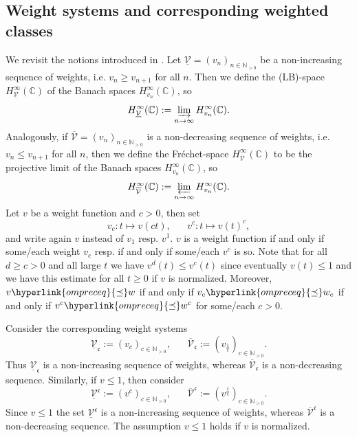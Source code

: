 \documentclass[10pt]{amsart}%
\numberwithin{equation}{section}
\theoremstyle{plain}
\newcommand{\CC}{\mathbb{C}}
\newcommand{\NN}{\mathbb{N}}
\begin{document}
\subsection{Weight systems and corresponding weighted classes}\label{basicweightsection}
We revisit the notions introduced in \cite[Sect. 2.2]{weightedentirecharacterization}. Let $\underline{\mathcal{V}}=(v_n)_{n\in\NN_{>0}}$ be a non-increasing sequence of weights, i.e. $v_n\ge v_{n+1}$ for all $n$. Then we define the (LB)-space $H^{\infty}_{\underline{\mathcal{V}}}(\CC)$ of the Banach spaces $H^{\infty}_{v_n}(\CC)$, so
\begin{equation}\label{indlim}
H^{\infty}_{\underline{\mathcal{V}}}(\CC):=\varinjlim_{n\rightarrow\infty}H^{\infty}_{v_n}(\CC).
\end{equation}
Analogously, if $\overline{\mathcal{V}}=(v_n)_{n\in\NN_{>0}}$ is a non-decreasing sequence of weights, i.e. $v_n\le v_{n+1}$ for all $n$, then we define the Fr\'{e}chet-space $H^{\infty}_{\overline{\mathcal{V}}}(\CC)$ to be the projective limit of the Banach spaces $H^{\infty}_{v_n}(\CC)$, so
\begin{equation}\label{projlim}
H^{\infty}_{\overline{\mathcal{V}}}(\CC):=\varprojlim_{n\rightarrow\infty}H^{\infty}_{v_n}(\CC).
\end{equation}
Let $v$ be a weight function and $c>0$, then set
\begin{equation}\label{parameterweights}
v_c: t\mapsto v(ct),\hspace{20pt}v^c: t\mapsto v(t)^c,
\end{equation}
and write again $v$ instead of $v_1$ resp. $v^1$. $v$ is a weight function if and only if some/each weight $v_c$ resp. if and only if some/each $v^c$ is so. Note that for all $d\ge c>0$ and all large $t$ we have $v^d(t)\le v^c(t)$ since eventually $v(t)\le 1$ and we have this estimate for all $t\ge 0$ if $v$ is normalized. Moreover, $v\hyperlink{ompreceq}{\preceq}w$ if and only if $v_c\hyperlink{ompreceq}{\preceq}w_c$ if and only if $v^c\hyperlink{ompreceq}{\preceq}w^c$ for some/each $c>0$.

Consider the corresponding weight systems
\begin{equation}\label{weightsystems}
\underline{\mathcal{V}}_{\mathfrak{c}}:=(v_c)_{c\in\NN_{>0}},\hspace{20pt}\overline{\mathcal{V}}_{\mathfrak{c}}:=(v_{\frac{1}{c}})_{c\in\NN_{>0}}.
\end{equation}
Thus $\underline{\mathcal{V}}_{\mathfrak{c}}$ is a non-increasing sequence of weights, whereas $\overline{\mathcal{V}}_{\mathfrak{c}}$ is a non-decreasing sequence. Similarly, if $v\le 1$, then consider
\begin{equation}\label{weightsystems1}
\underline{\mathcal{V}}^{\mathfrak{c}}:=(v^c)_{c\in\NN_{>0}},\hspace{20pt}\overline{\mathcal{V}}^{\mathfrak{c}}:=(v^{\frac{1}{c}})_{c\in\NN_{>0}}.
\end{equation}
Since $v\le 1$ the set $\underline{\mathcal{V}}^{\mathfrak{c}}$ is a non-increasing sequence of weights, whereas $\overline{\mathcal{V}}^{\mathfrak{c}}$ is a non-decreasing sequence. The assumption $v\le 1$ holds if $v$ is normalized.
\end{document}
